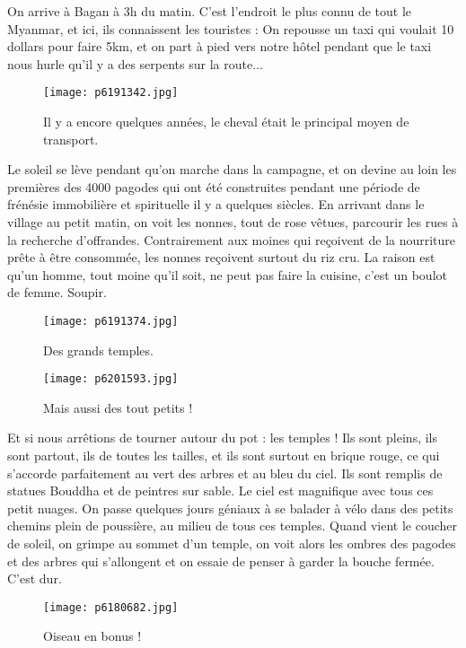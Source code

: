 \documentclass{book}
\begin{document}
On arrive à Bagan à 3h du matin. C'est l'endroit le plus connu de tout le Myanmar, et ici, ils connaissent les touristes : On repousse un taxi qui voulait 10 dollars pour faire 5km, et on part à pied vers notre hôtel pendant que le taxi nous hurle qu'il y a des serpents sur la route...


\begin{figure}[h]
\centering
\texttt{[image: p6191342.jpg]}
\caption*{Il y a encore quelques années, le cheval était le principal moyen de transport.}
\end{figure}

Le soleil se lève pendant qu'on marche dans la campagne, et on devine au loin les premières des 4000 pagodes qui ont été construites pendant une période de frénésie immobilière et spirituelle il y a quelques siècles. En arrivant dans le village au petit matin, on voit les nonnes, tout de rose vêtues, parcourir les rues à la recherche d'offrandes. Contrairement aux moines qui reçoivent de la nourriture prête à être consommée, les nonnes reçoivent surtout du riz cru. La raison est qu'un homme, tout moine qu'il soit, ne peut pas faire la cuisine, c'est un boulot de femme. Soupir.


\begin{figure}[h]
\centering
\texttt{[image: p6191374.jpg]}
\caption*{Des grands temples.}
\end{figure}


\begin{figure}[h]
\centering
\texttt{[image: p6201593.jpg]}
\caption*{Mais aussi des tout petits !}
\end{figure}

Et si nous arrêtions de tourner autour du pot : les temples ! Ils sont pleins, ils sont partout, ils de toutes les tailles, et ils sont surtout en brique rouge, ce qui s'accorde parfaitement au vert des arbres et au bleu du ciel. Ils sont remplis de statues Bouddha et de peintres sur sable. Le ciel est magnifique avec tous ces petit nuages. On passe quelques jours géniaux à se balader à vélo dans des petits chemins plein de poussière, au milieu de tous ces temples. Quand vient le coucher de soleil, on grimpe au sommet d'un temple, on voit alors les ombres des pagodes et des arbres qui s'allongent et on essaie de penser à garder la bouche fermée. C'est dur.


\begin{figure}[h]
\centering
\texttt{[image: p6180682.jpg]}
\caption*{Oiseau en bonus !}
\end{figure}
\end{document}
